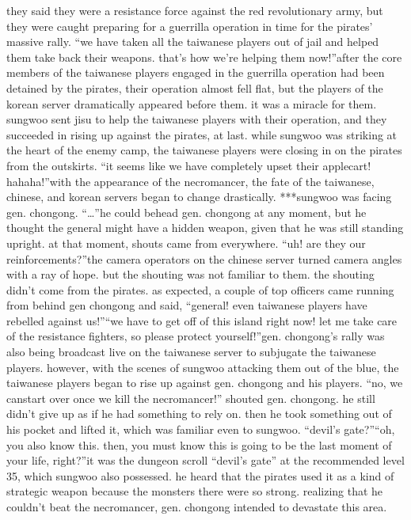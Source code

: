 they said they were a resistance force against the red revolutionary army, but they were caught preparing for a guerrilla operation in time for the pirates’ massive rally.
“we have taken all the taiwanese players out of jail and helped them take back their weapons.
 that’s how we’re helping them now!”after the core members of the taiwanese players engaged in the guerrilla operation had been detained by the pirates, their operation almost fell flat, but the players of the korean server dramatically appeared before them.
 it was a miracle for them.
sungwoo sent jisu to help the taiwanese players with their operation, and they succeeded in rising up against the pirates, at last.
while sungwoo was striking at the heart of the enemy camp, the taiwanese players were closing in on the pirates from the outskirts.
“it seems like we have completely upset their applecart! hahaha!”with the appearance of the necromancer, the fate of the taiwanese, chinese, and korean servers began to change drastically.
***sungwoo was facing gen.
 chongong.
“…”he could behead gen.
 chongong at any moment, but he thought the general might have a hidden weapon, given that he was still standing upright.
at that moment, shouts came from everywhere.
“uh! are they our reinforcements?”the camera operators on the chinese server turned camera angles with a ray of hope.
but the shouting was not familiar to them.
 the shouting didn’t come from the pirates.
as expected, a couple of top officers came running from behind gen chongong and said, “general! even taiwanese players have rebelled against us!”“we have to get off of this island right now! let me take care of the resistance fighters, so please protect yourself!”gen.
 chongong’s rally was also being broadcast live on the taiwanese server to subjugate the taiwanese players.
 however, with the scenes of sungwoo attacking them out of the blue, the taiwanese players began to rise up against gen.
 chongong and his players.
“no, we canstart over once we kill the necromancer!” shouted gen.
 chongong.
he still didn’t give up as if he had something to rely on.
then he took something out of his pocket and lifted it, which was familiar even to sungwoo.
“devil’s gate?”“oh, you also know this.
 then, you must know this is going to be the last moment of your life, right?”it was the dungeon scroll “devil’s gate” at the recommended level 35, which sungwoo also possessed.
 he heard that the pirates used it as a kind of strategic weapon because the monsters there were so strong.
realizing that he couldn’t beat the necromancer, gen.
 chongong intended to devastate this area.
